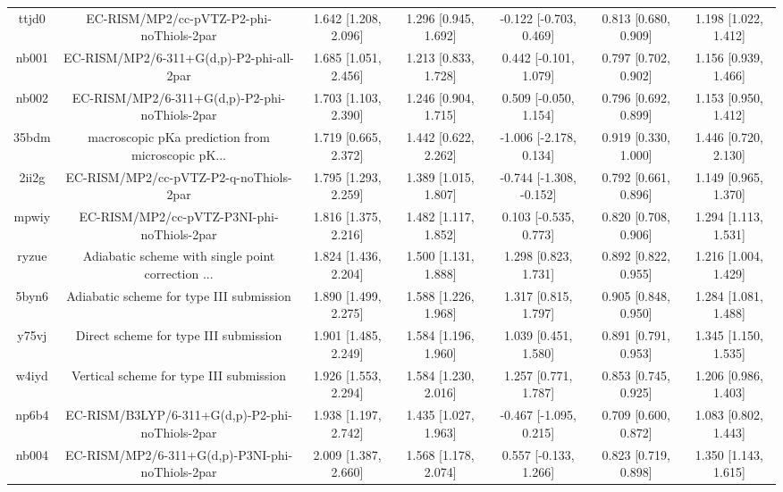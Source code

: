\documentclass{article}
\begin{document}
\begin{center}
\begin{longtable}{|ccccccc|}
 ttjd0 &           EC-RISM/MP2/cc-pVTZ-P2-phi-noThiols-2par &  1.642 [1.208, 2.096] &  1.296 [0.945, 1.692] &   -0.122 [-0.703, 0.469] &  0.813 [0.680, 0.909] &   1.198 [1.022, 1.412] \\
 nb001 &           EC-RISM/MP2/6-311+G(d,p)-P2-phi-all-2par &  1.685 [1.051, 2.456] &  1.213 [0.833, 1.728] &    0.442 [-0.101, 1.079] &  0.797 [0.702, 0.902] &   1.156 [0.939, 1.466] \\
 nb002 &      EC-RISM/MP2/6-311+G(d,p)-P2-phi-noThiols-2par &  1.703 [1.103, 2.390] &  1.246 [0.904, 1.715] &    0.509 [-0.050, 1.154] &  0.796 [0.692, 0.899] &   1.153 [0.950, 1.412] \\
 35bdm &  macroscopic pKa prediction from microscopic pK... &  1.719 [0.665, 2.372] &  1.442 [0.622, 2.262] &   -1.006 [-2.178, 0.134] &  0.919 [0.330, 1.000] &   1.446 [0.720, 2.130] \\
 2ii2g &             EC-RISM/MP2/cc-pVTZ-P2-q-noThiols-2par &  1.795 [1.293, 2.259] &  1.389 [1.015, 1.807] &  -0.744 [-1.308, -0.152] &  0.792 [0.661, 0.896] &   1.149 [0.965, 1.370] \\
 mpwiy &         EC-RISM/MP2/cc-pVTZ-P3NI-phi-noThiols-2par &  1.816 [1.375, 2.216] &  1.482 [1.117, 1.852] &    0.103 [-0.535, 0.773] &  0.820 [0.708, 0.906] &   1.294 [1.113, 1.531] \\
 ryzue &  Adiabatic scheme with single point correction ... &  1.824 [1.436, 2.204] &  1.500 [1.131, 1.888] &     1.298 [0.823, 1.731] &  0.892 [0.822, 0.955] &   1.216 [1.004, 1.429] \\
 5byn6 &           Adiabatic scheme for type III submission &  1.890 [1.499, 2.275] &  1.588 [1.226, 1.968] &     1.317 [0.815, 1.797] &  0.905 [0.848, 0.950] &   1.284 [1.081, 1.488] \\
 y75vj &              Direct scheme for type III submission &  1.901 [1.485, 2.249] &  1.584 [1.196, 1.960] &     1.039 [0.451, 1.580] &  0.891 [0.791, 0.953] &   1.345 [1.150, 1.535] \\
 w4iyd &            Vertical scheme for type III submission &  1.926 [1.553, 2.294] &  1.584 [1.230, 2.016] &     1.257 [0.771, 1.787] &  0.853 [0.745, 0.925] &   1.206 [0.986, 1.403] \\
 np6b4 &    EC-RISM/B3LYP/6-311+G(d,p)-P2-phi-noThiols-2par &  1.938 [1.197, 2.742] &  1.435 [1.027, 1.963] &   -0.467 [-1.095, 0.215] &  0.709 [0.600, 0.872] &   1.083 [0.802, 1.443] \\
 nb004 &    EC-RISM/MP2/6-311+G(d,p)-P3NI-phi-noThiols-2par &  2.009 [1.387, 2.660] &  1.568 [1.178, 2.074] &    0.557 [-0.133, 1.266] &  0.823 [0.719, 0.898] &   1.350 [1.143, 1.615] \\

\end{longtable}
\end{center}
\end{document}
